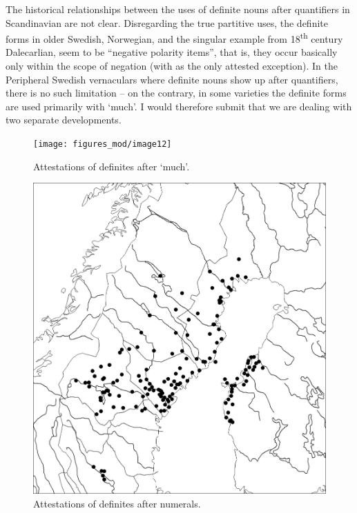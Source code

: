 The historical relationships between the uses of definite nouns after quantifiers in Scandinavian are not clear. Disregarding the true partitive uses, the definite forms in older Swedish, Norwegian, and the singular example from 18\textsuperscript{th} century Dalecarlian, seem to be “negative polarity items”, that is, they occur basically only within the scope of negation (with  as the only attested exception). In the Peripheral Swedish vernaculars where definite nouns show up after quantifiers, there is no such limitation – on the contrary, in some varieties the definite forms are used primarily with ‘much’. I would therefore submit that we are dealing with two separate developments. 

\begin{figure}[h]

\texttt{[image: figures\_mod/image12]}
\caption{Attestations of definites after ‘much’.}
\label{map:12}

\end{figure}

\begin{figure}[h]
\includegraphics{figures_mod/image13}
\caption{Attestations of definites after numerals.}
\label{map:13}

\end{figure}

